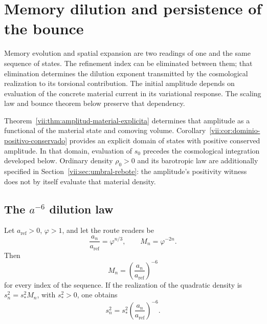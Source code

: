 
\section{Memory dilution and persistence of the bounce}
\label{vii:sec:dilucion-rebote}

Memory evolution and spatial expansion are two readings of
one and the same sequence of states. The refinement index can be eliminated
between them; that elimination determines the dilution exponent transmitted
by the cosmological realization to its torsional contribution.
The initial amplitude depends on evaluation of the concrete material
current in its variational response. The scaling law and bounce
theorem below preserve that dependency.

Theorem~\ref{vii:thm:amplitud-material-explicita} determines that
amplitude as a functional of the material state and comoving volume.
Corollary~\ref{vii:cor:dominio-positivo-conservado} provides
an explicit domain of states with positive conserved amplitude.
In that domain, evaluation of \(s_0\) precedes the cosmological
integration developed below. Ordinary density
\(\rho_0>0\) and its barotropic law are additionally specified in
Section~\ref{vii:sec:umbral-rebote}: the amplitude's positivity witness
does not by itself evaluate that material density.

\subsection{The \(a^{-6}\) dilution law}
\label{vii:sec:dilucion}

\begin{proposition}
\label{vii:prop:dilucion}
Let \(a_{\mathrm{ref}}>0\), \(\varphi>1\), and let the route readers be
\[
 \frac{a_n}{a_{\mathrm{ref}}}=\varphi^{n/3},\qquad
 M_n=\varphi^{-2n}.
\]
Then
\[
 M_n=\left(\frac{a_n}{a_{\mathrm{ref}}}\right)^{-6}
\]
for every index of the sequence. If the realization of the quadratic
density is \(s_n^2=s_*^2M_n\), with \(s_*^2>0\), one obtains
\[
 s_n^2=s_*^2\left(\frac{a_n}{a_{\mathrm{ref}}}\right)^{-6}.
\]
\end{proposition}

